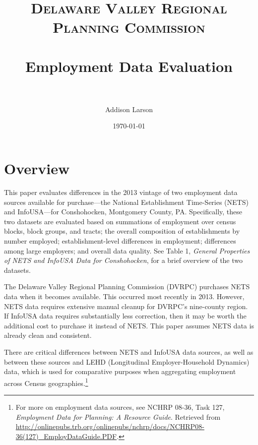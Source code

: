 \documentclass[paper = letter, fontsize = 11pt]{scrartcl}
\title{	
\normalfont \normalsize 
\textsc{Delaware Valley Regional Planning Commission} \\ [25pt]
\horrule{0.5pt} \\[0.4cm]
\huge Employment Data Evaluation \\
\horrule{2pt} \\[0.5cm]
}
\author{\normalsize Addison Larson}
\date{\normalsize\today}
\begin{document}
\maketitle
\section{Overview}
This paper evaluates differences in the 2013 vintage of two employment data sources available for purchase---the National Establishment Time-Series (NETS) and InfoUSA---for Conshohocken, Montgomery County, PA. Specifically, these two datasets are evaluated based on summations of employment over census blocks, block groups, and tracts; the overall composition of establishments by number employed; establishment-level differences in employment; differences among large employers; and overall data quality. See Table 1, \textit{General Properties of NETS and InfoUSA Data for Conshohocken}, for a brief overview of the two datasets.\par
The Delaware Valley Regional Planning Commission (DVRPC) purchases NETS data when it becomes available. This occurred most recently in 2013. However, NETS data requires extensive manual cleanup for DVRPC's nine-county region. If InfoUSA data requires substantially less correction, then it may be worth the additional cost to purchase it instead of NETS. This paper assumes NETS data is already clean and consistent.\par
There are critical differences between NETS and InfoUSA data sources, as well as between these sources and LEHD (Longitudinal Employer-Household Dynamics) data, which is used for comparative purposes when aggregating employment across Census geographies.\footnote{For more on employment data sources, see NCHRP 08-36, Task 127, \textit{Employment Data for Planning: A Resource Guide}. Retrieved from \href{http://onlinepubs.trb.org/onlinepubs/nchrp/docs/NCHRP08-36(127)_EmployDataGuide.PDF}{http://onlinepubs.trb.org/onlinepubs/nchrp/docs/NCHRP08-36(127)\_EmployDataGuide.PDF}.}
\end{document}
